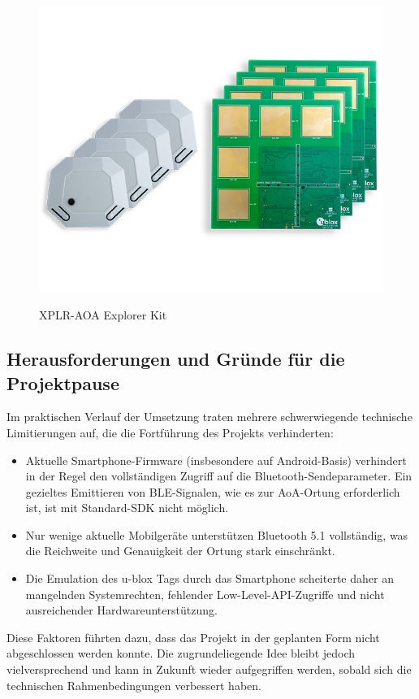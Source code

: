 \documentclass[a4paper, 12pt]{article} %
\begin{document}
 \begin{figure}[H]
    \includegraphics[width=1\linewidth]{images/XPLR-AOA-with-C209-and-C211-02_0}\\[1ex]
    \centering
    \caption{XPLR-AOA Explorer Kit}
    \label{ABBILDUNG}
\end{figure}

 \subsection{Herausforderungen und Gründe für die Projektpause}
 Im praktischen Verlauf der Umsetzung traten mehrere schwerwiegende technische Limitierungen auf, die die Fortführung des Projekts verhinderten:

 \begin{itemize}
    \item Aktuelle Smartphone-Firmware (insbesondere auf Android-Basis) verhindert in der Regel den vollständigen Zugriff auf die Bluetooth-Sendeparameter. Ein gezieltes Emittieren von \acf{BLE}-Signalen, wie es zur \ac{AoA}-Ortung erforderlich ist, ist mit Standard-\acf{SDK} nicht möglich.
    \item Nur wenige aktuelle Mobilgeräte unterstützen Bluetooth 5.1 vollständig, was die Reichweite und Genauigkeit der Ortung stark einschränkt.
    \item Die Emulation des u-blox Tags durch das Smartphone scheiterte daher an mangelnden Systemrechten, fehlender Low-Level-\acf{API}-Zugriffe und nicht ausreichender Hardwareunterstützung.
 \end{itemize}
Diese Faktoren führten dazu, dass das Projekt in der geplanten Form nicht abgeschlossen werden konnte. 
Die zugrundeliegende Idee bleibt jedoch vielversprechend und kann in Zukunft wieder aufgegriffen werden, sobald sich 
die technischen Rahmenbedingungen verbessert haben.
\end{document}
